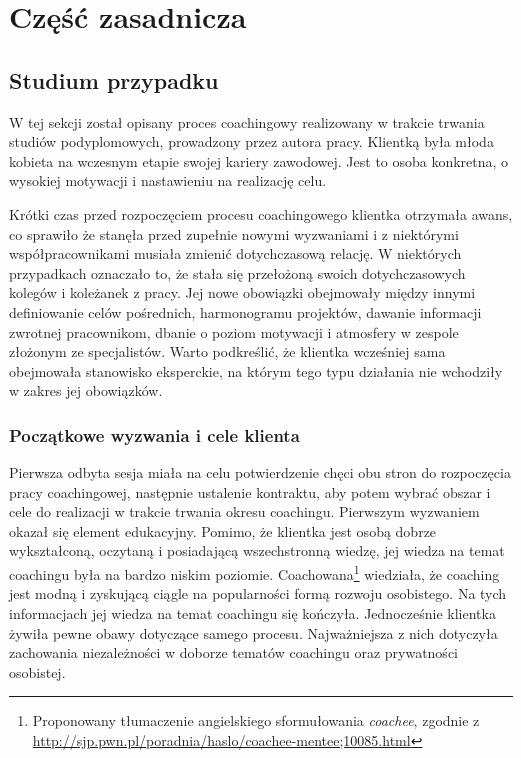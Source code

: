 
\chapter{Część zasadnicza}

\section{Studium przypadku}

W tej sekcji został opisany proces coachingowy realizowany w trakcie trwania studiów podyplomowych, prowadzony przez autora pracy. Klientką była
młoda kobieta na wczesnym etapie swojej kariery zawodowej. Jest to osoba konkretna, o wysokiej motywacji i nastawieniu na realizację celu.

Krótki czas przed rozpoczęciem procesu coachingowego klientka otrzymała awans, co sprawiło
że stanęła przed zupełnie nowymi wyzwaniami i z niektórymi współpracownikami musiała zmienić dotychczasową relację. W niektórych przypadkach oznaczało
to, że stała się przełożoną swoich dotychczasowych kolegów i koleżanek z pracy. Jej nowe obowiązki obejmowały między innymi definiowanie celów pośrednich,
harmonogramu projektów, dawanie informacji zwrotnej pracownikom, dbanie o poziom motywacji i atmosfery w zespole złożonym ze specjalistów. Warto podkreślić,
że klientka wcześniej sama obejmowała stanowisko eksperckie, na którym tego typu działania nie wchodziły w zakres jej obowiązków.

\subsection{Początkowe wyzwania i cele klienta}

Pierwsza odbyta sesja miała na celu potwierdzenie chęci obu stron do rozpoczęcia pracy coachingowej, następnie ustalenie kontraktu, aby potem wybrać obszar
i cele do realizacji w trakcie trwania okresu coachingu. Pierwszym wyzwaniem okazał się element edukacyjny. Pomimo, że klientka jest osobą dobrze
wykształconą, oczytaną i posiadającą wszechstronną wiedzę, jej wiedza na temat coachingu była na bardzo niskim poziomie. Coachowana\footnote{Proponowany
tłumaczenie angielskiego sformułowania \emph{coachee}, zgodnie z \url{http://sjp.pwn.pl/poradnia/haslo/coachee-mentee;10085.html}} wiedziała, że coaching
jest modną i zyskującą ciągle na popularności formą rozwoju osobistego. Na tych informacjach jej wiedza na temat coachingu się kończyła. Jednocześnie
klientka żywiła pewne obawy dotyczące samego procesu. Najważniejsza z nich dotyczyła zachowania niezależności w doborze tematów coachingu oraz prywatności
osobistej.

